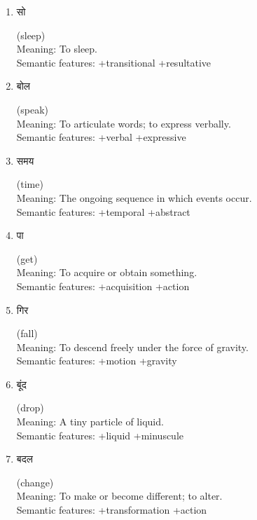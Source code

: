 \documentclass{article}
\begin{document}
\begin{enumerate}
\item \begin{hindi} सो \end{hindi} (sleep) \\
Meaning: To sleep. \\
Semantic features: +transitional +resultative

\item \begin{hindi} बोल \end{hindi} (speak) \\
Meaning: To articulate words; to express verbally. \\
Semantic features: +verbal +expressive

\item \begin{hindi} समय \end{hindi} (time) \\
Meaning: The ongoing sequence in which events occur. \\
Semantic features: +temporal +abstract

\item \begin{hindi} पा \end{hindi} (get) \\
Meaning: To acquire or obtain something. \\
Semantic features: +acquisition +action

\item \begin{hindi} गिर \end{hindi} (fall) \\
Meaning: To descend freely under the force of gravity. \\
Semantic features: +motion +gravity

\item \begin{hindi} बूंद \end{hindi} (drop) \\
Meaning: A tiny particle of liquid. \\
Semantic features: +liquid +minuscule

\item \begin{hindi} बदल \end{hindi} (change) \\
Meaning: To make or become different; to alter. \\
Semantic features: +transformation +action


\end{enumerate}
\end{document}
